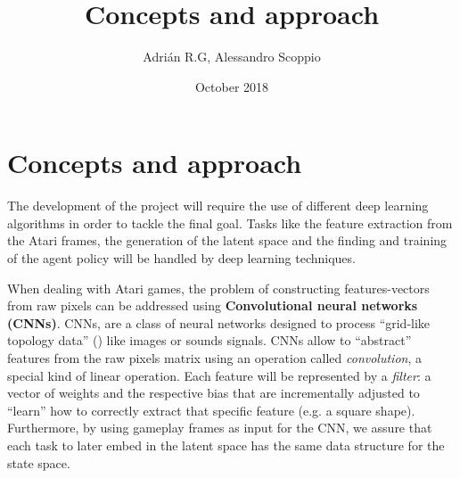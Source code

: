 \documentclass{article}
\title{Concepts and approach}
\author{Adrián R.G, Alessandro Scoppio}
\date{October 2018}
\begin{document}
\maketitle

\section{Concepts and approach}

The development of the project will require the use of different deep learning algorithms in order to tackle the final goal. Tasks like the feature extraction from the Atari frames, the generation of the latent space and the finding and training of the agent policy will be handled by deep learning techniques.

When dealing with Atari games, the problem of constructing features-vectors from raw pixels can be addressed using \textbf{Convolutional neural networks (CNNs)}.
CNNs, are a class of neural networks designed to process ``grid-like topology data'' (\cite{goodfellow2016deep}) like images or sounds signals. CNNs allow to ``abstract'' features from the raw pixels matrix using an operation called \textit{convolution}, a special kind of linear operation. Each feature will be represented by a \textit{filter}: a vector of weights and the respective bias that are incrementally adjusted to ``learn'' how to correctly extract that specific feature (e.g. a square shape). 
Furthermore, by using gameplay frames as input for the CNN, we assure that each task to later embed in the latent space has the same data structure for the state space.  




\end{document}
